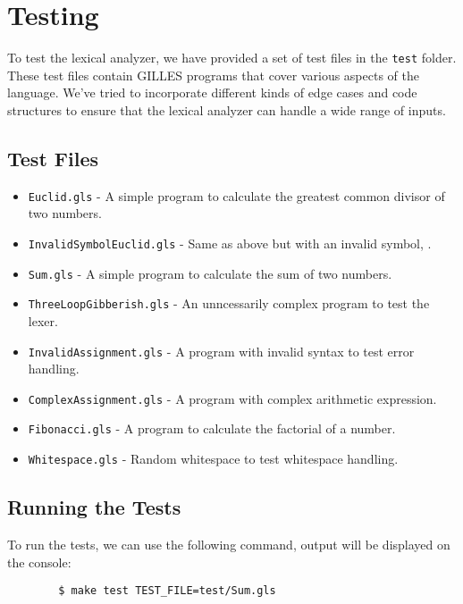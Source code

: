 \chapter{Testing}
    To test the lexical analyzer, we have provided a set of test files in the \texttt{test} folder. These test files contain GILLES programs that cover various aspects of the language.
	We've tried to incorporate different kinds of edge cases and code structures to ensure that the lexical analyzer can handle a wide range of inputs.
	\section{Test Files}
	\begin{itemize}
		\item \texttt{Euclid.gls} - A simple program to calculate the greatest common divisor of two numbers.
		\item \texttt{InvalidSymbolEuclid.gls} - Same as above but with an invalid symbol, .
		\item \texttt{Sum.gls} - A simple program to calculate the sum of two numbers.
		\item \texttt{ThreeLoopGibberish.gls} - An unncessarily complex program to test the lexer.
		\item \texttt{InvalidAssignment.gls} - A program with invalid syntax to test error handling.
		\item \texttt{ComplexAssignment.gls} - A program with complex arithmetic expression.
		\item \texttt{Fibonacci.gls} - A program to calculate the factorial of a number.
		\item \texttt{Whitespace.gls} - Random whitespace to test whitespace handling.
	\end{itemize}

	\section{Running the Tests}
	To run the tests, we can use the following command, output will be displayed on the console:
	\begin{verbatim}
		$ make test TEST_FILE=test/Sum.gls
    \end{verbatim}
  
